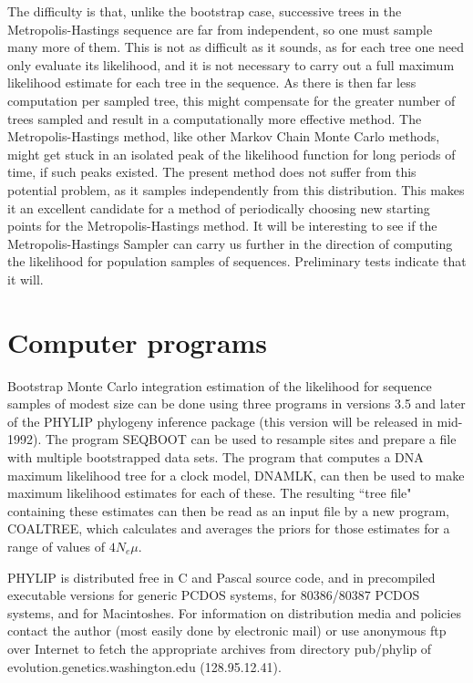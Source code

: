The difficulty is that, unlike the bootstrap case, successive trees in
the Metropolis-Hastings
sequence are far from independent, so one must sample many more of them.
This is not as difficult as it sounds, as for each tree one need only
evaluate its likelihood, and it is not necessary to carry out a full
maximum likelihood estimate for each tree in the sequence.  As there is
then far less computation per sampled tree, this might compensate for the
greater number of trees sampled and result in a computationally more effective
method.  The Metropolis-Hastings method, like other
Markov Chain Monte Carlo methods, might get stuck in an isolated peak of the
likelihood function for long periods of time, if such peaks existed.  The
present method does not suffer from this potential problem, as it samples
independently from this distribution.  This makes it an excellent candidate
for a method of periodically choosing new starting points for the
Metropolis-Hastings method.  It will be interesting to see if the 
Metropolis-Hastings Sampler can carry us further in the direction of computing
the likelihood for population samples of sequences.  Preliminary tests
indicate that it will.

\section{Computer programs}

Bootstrap Monte Carlo integration estimation of the likelihood for
sequence samples of modest size can be done using three programs in versions
3.5 and later of the PHYLIP phylogeny inference package (this version will
be released in mid-1992).  The program SEQBOOT can be used to
resample sites and prepare a file with multiple bootstrapped data sets.
The program that computes a DNA maximum likelihood tree for a clock model,
DNAMLK, can then be used
to make maximum likelihood estimates for each of
these.  The resulting ``tree file" containing these estimates can then be
read as an input file by a new program, COALTREE, which calculates and
averages the priors for those estimates for a range of values of $4N_e\mu$.

PHYLIP is distributed free in C and Pascal source code, and in precompiled
executable versions for generic PCDOS systems, for 80386/80387 PCDOS systems,
and for Macintoshes.  For information on distribution media and policies
contact the author (most easily done by electronic mail)
or use anonymous ftp over Internet to fetch the appropriate
archives from directory pub/phylip of evolution.genetics.washington.edu
(128.95.12.41).
\bigskip


